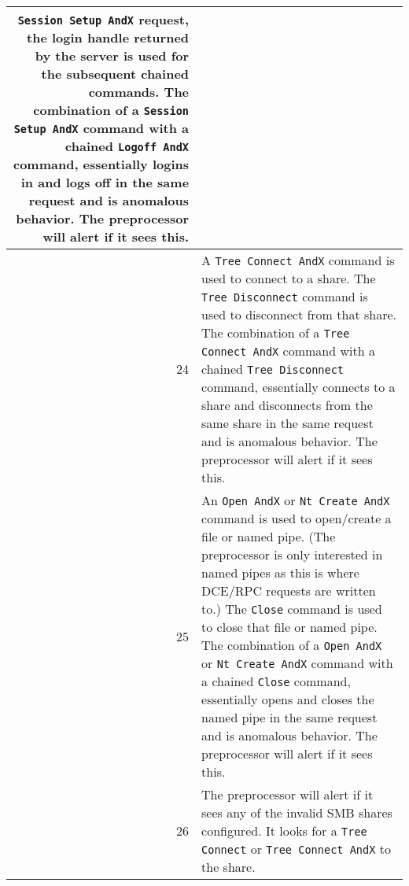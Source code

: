 \documentclass[english]{report}
\begin{document}
\begin{itemize}
\begin{longtable}{|r|p{13.5cm}|}
      \texttt{Session Setup AndX} request, the login handle returned by the
      server is used for the subsequent chained commands. The combination of a
      \texttt{Session Setup AndX} command with a chained \texttt{Logoff AndX}
      command, essentially logins in and logs off in the same request and is
      anomalous behavior. The preprocessor will alert if it sees this.\\
\hline
 24 & A \texttt{Tree Connect AndX} command is used to connect to a share. The
      \texttt{Tree Disconnect} command is used to disconnect from that share.
      The combination of a \texttt{Tree Connect AndX} command with a chained
      \texttt{Tree Disconnect} command, essentially connects to a share and
      disconnects from the same share in the same request and is anomalous
      behavior. The preprocessor will alert if it sees this.\\
\hline
 25 & An \texttt{Open AndX} or \texttt{Nt Create AndX} command is used to
      open/create a file or named pipe. (The preprocessor is only interested in
      named pipes as this is where DCE/RPC requests are written to.) The
      \texttt{Close} command is used to close that file or named pipe. The
      combination of a \texttt{Open AndX} or \texttt{Nt Create AndX} command
      with a chained \texttt{Close} command, essentially opens and closes the
      named pipe in the same request and is anomalous behavior.  The
      preprocessor will alert if it sees this.\\
\hline
 26 & The preprocessor will alert if it sees any of the invalid SMB shares
      configured. It looks for a \texttt{Tree Connect} or
      \texttt{Tree Connect AndX} to the share.\\
\hline
\end{longtable}
\end{itemize}
\end{document}
